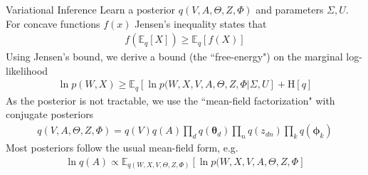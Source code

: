 \documentclass[xcolor=dvipsnames]{beamer}
\newcommand \ent[1] {
    \text{H} \left[ #1 \right]
}
\newcommand \ex[2] {
    \mathbb{E}_{ { #2 } }\left[ #1 \right]
}
\newcommand \vv[1] { \boldsymbol #1 }
\newcommand \thd[0]  { { \vv \theta_d } }
\begin{document}
\begin{frame}{Variational Inference}
 {
    Learn a posterior $q(V,A,\Theta,Z,\Phi)$ and parameters $\Sigma, U$. \\
    \medskip
} {
    For concave functions $f(x)$ Jensen's inequality states that
    \begin{align*}
    f \left( \ex{X}{q} \right) \geq \ex{f(X)}{q}
    \end{align*}
}
 {
    Using Jensen's bound, we derive a bound (the ``free-energy") on the marginal log-likelihood
    \begin{align*}
    \ln p(W,X) \geq \ex{\ln p(W,X,V,A,\Theta,Z,\Phi | \Sigma, U}{q} + \ent{q}
    \end{align*}
}
 {
    As the posterior is not tractable, we use the ``mean-field factorization" with conjugate posteriors
    \begin{align*}
    q(V,A,\Theta,Z,\Phi) = q(V)q(A)\prod_d q(\thd)\prod_n q(z_{dn}) \prod_k q(\vv{\phi}_k)
    \end{align*}
}
 {
    Most posteriors follow the usual mean-field form, e.g.
    \begin{align*}
    \ln q(A) \propto \ex{\ln p(W,X,V,A,\Theta,Z,\Phi}{q(W,X,V,\Theta,Z,\Phi)}
    \end{align*}
}
\end{frame}


\end{document}

